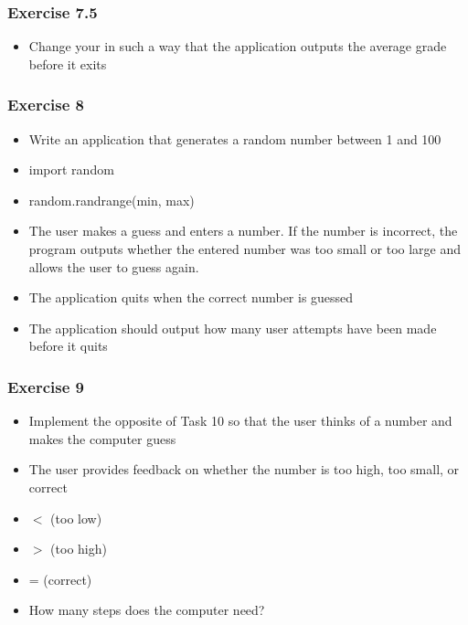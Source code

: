 \documentclass[10pt, a4paper]{beamer} %
\begin{document}
{\begin{frame}\frametitle{Exercise 7.5}

    \begin{itemize}
        \item Change your in such a way that the application outputs the average grade before it exits
    \end{itemize}


\end{frame}

\begin{frame}[c, fragile]\frametitle{Exercise 8}

    \begin{itemize}
        \item  Write an application that generates a random number between 1
              and 100
        \item  import random
        \item  random.randrange(min, max)
        \item  The user makes a guess and enters a number. If the number is incorrect, the program outputs whether the entered number was too small or too large and allows the user to guess again.
        \item  The application quits when the correct number is guessed
        \item  The application should output how many user attempts have been
              made before it quits
    \end{itemize}

\end{frame}

\begin{frame}[c, fragile]\frametitle{Exercise 9}

    \begin{itemize}
        \item Implement the opposite of Task 10 so that the user thinks of a number and makes the computer guess
        \item The user provides feedback on whether the number is too high, too small, or correct
        \item $<$ (too low)
        \item $>$ (too high)
        \item = (correct)
        \item How many steps does the computer need?
    \end{itemize}
\end{frame}


}
\end{document}
